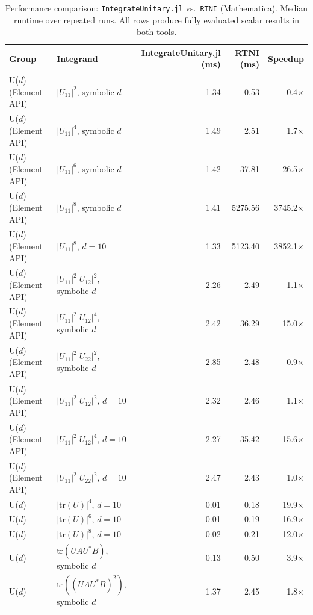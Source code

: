 \documentclass[manuscript,screen]{acmart}
\begin{document}
\begin{table}[t]
  \centering
  \caption{Performance comparison: \texttt{IntegrateUnitary.jl} vs.\ \texttt{RTNI}
  (Mathematica). Median runtime over repeated runs. All rows produce
  fully evaluated scalar results in both tools.}
  \label{tab:rtni_comparison}
  \begin{tabular}{llrrr}
    \hline
    Group & Integrand & IntegrateUnitary.jl (ms) & RTNI (ms) & Speedup \\
    \hline
    U($d$) (Element API) & $|U_{11}|^2$, symbolic $d$ & 1.34 & 0.53 & 0.4$\times$ \\
    U($d$) (Element API) & $|U_{11}|^4$, symbolic $d$ & 1.49 & 2.51 & 1.7$\times$ \\
    U($d$) (Element API) & $|U_{11}|^6$, symbolic $d$ & 1.42 & 37.81 & 26.5$\times$ \\
    U($d$) (Element API) & $|U_{11}|^8$, symbolic $d$ & 1.41 & 5275.56 & 3745.2$\times$ \\
    U($d$) (Element API) & $|U_{11}|^8$, $d=10$ & 1.33 & 5123.40 & 3852.1$\times$ \\
    U($d$) (Element API) & $|U_{11}|^2|U_{12}|^2$, symbolic $d$ & 2.26 & 2.49 & 1.1$\times$ \\
    U($d$) (Element API) & $|U_{11}|^2|U_{12}|^4$, symbolic $d$ & 2.42 & 36.29 & 15.0$\times$ \\
    U($d$) (Element API) & $|U_{11}|^2|U_{22}|^2$, symbolic $d$ & 2.85 & 2.48 & 0.9$\times$ \\
    U($d$) (Element API) & $|U_{11}|^2|U_{12}|^2$, $d=10$ & 2.32 & 2.46 & 1.1$\times$ \\
    U($d$) (Element API) & $|U_{11}|^2|U_{12}|^4$, $d=10$ & 2.27 & 35.42 & 15.6$\times$ \\
    U($d$) (Element API) & $|U_{11}|^2|U_{22}|^2$, $d=10$ & 2.47 & 2.43 & 1.0$\times$ \\
    U($d$) & $|\mathrm{tr}(U)|^4$, $d=10$ & 0.01 & 0.18 & 19.9$\times$ \\
    U($d$) & $|\mathrm{tr}(U)|^6$, $d=10$ & 0.01 & 0.19 & 16.9$\times$ \\
    U($d$) & $|\mathrm{tr}(U)|^8$, $d=10$ & 0.02 & 0.21 & 12.0$\times$ \\
    U($d$) & $\mathrm{tr}(UAU^\ast B)$, symbolic $d$ & 0.13 & 0.50 & 3.9$\times$ \\
    U($d$) & $\mathrm{tr}((UAU^\ast B)^2)$, symbolic $d$ & 1.37 & 2.45 & 1.8$\times$ \\
    \hline
  \end{tabular}
\end{table}
\end{document}
